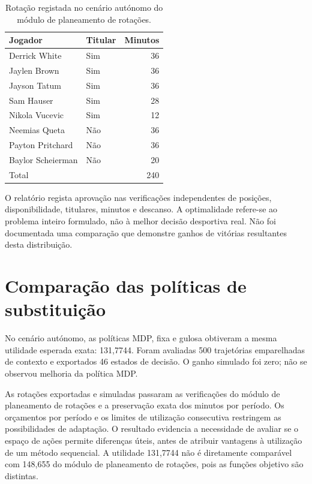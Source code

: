 \begin{table}[htbp]
\centering
\caption{Rotação registada no cenário autónomo do módulo de planeamento de rotações.}
\label{tab:rotacao}
\begin{tabular}{llr}
\toprule
Jogador & Titular & Minutos\\
\midrule
Derrick White & Sim & 36\\
Jaylen Brown & Sim & 36\\
Jayson Tatum & Sim & 36\\
Sam Hauser & Sim & 28\\
Nikola Vucevic & Sim & 12\\
Neemias Queta & Não & 36\\
Payton Pritchard & Não & 36\\
Baylor Scheierman & Não & 20\\
\midrule
Total & & 240\\
\bottomrule
\end{tabular}
\end{table}

O relatório regista aprovação nas verificações independentes de posições,
disponibilidade, titulares, minutos e descanso. A optimalidade refere-se
ao problema inteiro formulado, não à melhor decisão desportiva real.
Não foi documentada uma comparação que demonstre ganhos de vitórias
resultantes desta distribuição.

\section{Comparação das políticas de substituição}

No cenário autónomo, as políticas MDP, fixa e gulosa obtiveram a mesma
utilidade esperada exata: 131,7744. Foram avaliadas 500 trajetórias
emparelhadas de contexto e exportados 46 estados de decisão. O ganho
simulado foi zero; não se observou melhoria da política MDP.

As rotações exportadas e simuladas passaram as verificações do módulo de planeamento de rotações
e a preservação exata dos minutos por período. Os orçamentos por período
e os limites de utilização consecutiva restringem as possibilidades de
adaptação. O resultado evidencia a necessidade de avaliar se o espaço de
ações permite diferenças úteis, antes de atribuir vantagens à utilização
de um método sequencial. A utilidade 131,7744 não é diretamente comparável
com 148,655 do módulo de planeamento de rotações, pois as funções objetivo são distintas.

